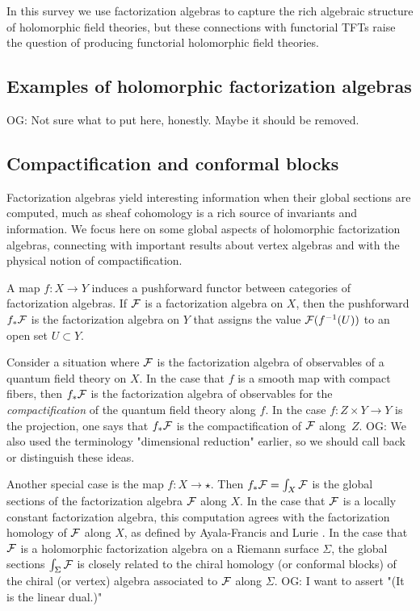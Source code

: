\documentclass[11pt]{amsart}
\def\owen#1{{\textcolor{violet!50!black}{OG: {#1}}}}
\begin{document}
In this survey we use factorization algebras to capture the rich algebraic structure of holomorphic field theories,
but these connections with functorial TFTs raise the question of producing functorial holomorphic field theories.

\subsection{Examples of holomorphic factorization algebras}

\owen{Not sure what to put here, honestly. Maybe it should be removed.}


\subsection{Compactification and conformal blocks}

Factorization algebras yield interesting information when their global sections are computed,
much as sheaf cohomology is a rich source of invariants and information.
We focus here on some global aspects of holomorphic factorization algebras,
connecting with important results about vertex algebras and with the physical notion of compactification.

A map $f \colon X \to Y$ induces a pushforward functor between categories of factorization algebras.
If $\mathcal F$ is a factorization algebra on $X$, 
then the pushforward $f_* \mathcal F$ is the factorization algebra on $Y$ that assigns the value $\mathcal F(f^{-1}(U))$ to an open set $U \subset Y$.

Consider a situation where $\mathcal F$ is the factorization algebra of observables of a quantum field theory on $X$.
In the case that $f$ is a smooth map with compact fibers, 
then $f_* \mathcal F$ is the factorization algebra of observables for the \textit{compactification} of the quantum field theory along $f$.
In the case $f \colon Z \times Y \to Y$ is the projection, 
one says that $f_* \mathcal F$ is the compactification of $\mathcal F$ along~$Z$.
\owen{We also used the terminology "dimensional reduction" earlier, so we should call back or distinguish these ideas.}

Another special case is the map $f: X \to \star$.
Then $f_* \mathcal F = \int_X \mathcal F$ is the global sections of the factorization algebra $\mathcal F$ along $X$.
In the case that $\mathcal F$ is a locally constant factorization algebra, 
this computation agrees with the factorization homology of $\mathcal F$ along $X$, as defined by Ayala-Francis and Lurie \cite{}.
In the case that $\mathcal F$ is a holomorphic factorization algebra on a Riemann surface $\Sigma$, 
the global sections $\int_\Sigma \mathcal F$ is closely related to the chiral homology (or conformal blocks) of the chiral (or vertex) algebra associated to $\mathcal F$ along $\Sigma$.
\owen{I want to assert "(It is the linear dual.)"}
\end{document}
